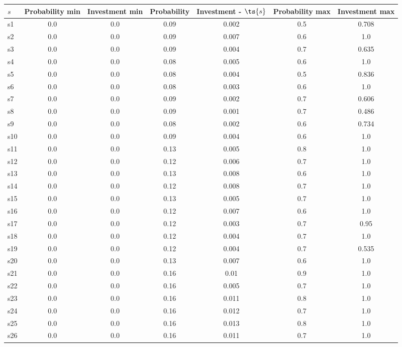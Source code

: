 \documentclass{article}
\begin{document}
\noindent\begin{tabular}{|l|c|c|c|c|c|c|}
\hline
$s$& Probability min & Investment min & Probability & Investment - $\ts{s}$ & Probability max & Investment max\\
\hline
s1 &0.0 & 0.0 & 0.09 & 0.002 & 0.5 & 0.708\\
\hline
s2 &0.0 & 0.0 & 0.09 & 0.007 & 0.6 & 1.0\\
\hline
s3 &0.0 & 0.0 & 0.09 & 0.004 & 0.7 & 0.635\\
\hline
s4 &0.0 & 0.0 & 0.08 & 0.005 & 0.6 & 1.0\\
\hline
s5 &0.0 & 0.0 & 0.08 & 0.004 & 0.5 & 0.836\\
\hline
s6 &0.0 & 0.0 & 0.08 & 0.003 & 0.6 & 1.0\\
\hline
s7 &0.0 & 0.0 & 0.09 & 0.002 & 0.7 & 0.606\\
\hline
s8 &0.0 & 0.0 & 0.09 & 0.001 & 0.7 & 0.486\\
\hline
s9 &0.0 & 0.0 & 0.08 & 0.002 & 0.6 & 0.734\\
\hline
s10 &0.0 & 0.0 & 0.09 & 0.004 & 0.6 & 1.0\\
\hline
s11 &0.0 & 0.0 & 0.13 & 0.005 & 0.8 & 1.0\\
\hline
s12 &0.0 & 0.0 & 0.12 & 0.006 & 0.7 & 1.0\\
\hline
s13 &0.0 & 0.0 & 0.13 & 0.008 & 0.6 & 1.0\\
\hline
s14 &0.0 & 0.0 & 0.12 & 0.008 & 0.7 & 1.0\\
\hline
s15 &0.0 & 0.0 & 0.13 & 0.005 & 0.7 & 1.0\\
\hline
s16 &0.0 & 0.0 & 0.12 & 0.007 & 0.6 & 1.0\\
\hline
s17 &0.0 & 0.0 & 0.12 & 0.003 & 0.7 & 0.95\\
\hline
s18 &0.0 & 0.0 & 0.12 & 0.004 & 0.7 & 1.0\\
\hline
s19 &0.0 & 0.0 & 0.12 & 0.004 & 0.7 & 0.535\\
\hline
s20 &0.0 & 0.0 & 0.13 & 0.007 & 0.6 & 1.0\\
\hline
s21 &0.0 & 0.0 & 0.16 & 0.01 & 0.9 & 1.0\\
\hline
s22 &0.0 & 0.0 & 0.16 & 0.005 & 0.7 & 1.0\\
\hline
s23 &0.0 & 0.0 & 0.16 & 0.011 & 0.8 & 1.0\\
\hline
s24 &0.0 & 0.0 & 0.16 & 0.012 & 0.7 & 1.0\\
\hline
s25 &0.0 & 0.0 & 0.16 & 0.013 & 0.8 & 1.0\\
\hline
s26 &0.0 & 0.0 & 0.16 & 0.011 & 0.7 & 1.0\\

\end{tabular}
\end{document}

